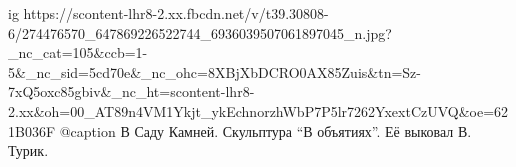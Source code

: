  
 
 
 
 

\ifcmt
  ig https://scontent-lhr8-2.xx.fbcdn.net/v/t39.30808-6/274476570_647869226522744_6936039507061897045_n.jpg?_nc_cat=105&ccb=1-5&_nc_sid=5cd70e&_nc_ohc=8XBjXbDCRO0AX85Zuis&tn=Sz-7xQ5oxc85gbiv&_nc_ht=scontent-lhr8-2.xx&oh=00_AT89n4VM1Ykjt_ykEchnorzhWbP7P5lr7262YxextCzUVQ&oe=621B036F
	@caption В Саду Камней. Скульптура \enquote{В объятиях}. Её выковал В. Турик.
\fi
